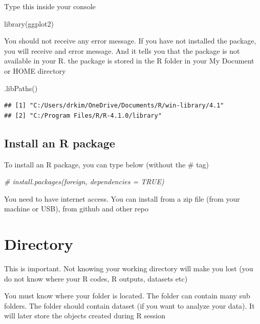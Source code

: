 \documentclass[
]{book}
\makeatletter
\newenvironment{Shaded}{\begin{snugshade}}{\end{snugshade}}
\newcommand{\CommentTok}[1]{\textcolor[rgb]{0.37,0.37,0.37}{\textit{#1}}}
\newcommand{\FunctionTok}[1]{\textcolor[rgb]{0,0,0}{#1}}
\newcommand{\NormalTok}[1]{#1}
\newenvironment{kframe}{%
\medskip{}
\setlength{\fboxsep}{.8em}
 \def\at@end@of@kframe{}%
 \ifinner\ifhmode%
  \def\at@end@of@kframe{\end{minipage}}%
  \begin{minipage}{\columnwidth}%
 \fi\fi%
 \def\FrameCommand##1{\hskip\@totalleftmargin \hskip-\fboxsep
 \colorbox{shadecolor}{##1}\hskip-\fboxsep
     \hskip-\linewidth \hskip-\@totalleftmargin \hskip\columnwidth}%
 \MakeFramed {\advance\hsize-\width
   \@totalleftmargin\z@ \linewidth\hsize
   \@setminipage}}%
 {\par\unskip\endMakeFramed%
 \at@end@of@kframe}
\renewenvironment{Shaded}{\begin{kframe}}{\end{kframe}}
\makeatother
\begin{document}
Type this inside your console

\begin{Shaded}
\begin{Highlighting}[]
\FunctionTok{library}\NormalTok{(ggplot2)}
\end{Highlighting}
\end{Shaded}

You should not receive any error message. If you have not installed the package, you will receive and error message. And it tells you that the package is not available in your R. the package is stored in the R folder in your My Document or HOME directory

\begin{Shaded}
\begin{Highlighting}[]
\FunctionTok{.libPaths}\NormalTok{()}
\end{Highlighting}
\end{Shaded}

\begin{verbatim}
## [1] "C:/Users/drkim/OneDrive/Documents/R/win-library/4.1"
## [2] "C:/Program Files/R/R-4.1.0/library"
\end{verbatim}

\hypertarget{install-an-r-package}{%
\subsection{Install an R package}\label{install-an-r-package}}

To install an R package, you can type below (without the \# tag)

\begin{Shaded}
\begin{Highlighting}[]
\CommentTok{\# install.packages(foreign, dependencies = TRUE)}
\end{Highlighting}
\end{Shaded}

You need to have internet access. You can install from a zip file (from your machine or USB), from github and other repo

\hypertarget{directory}{%
\section{Directory}\label{directory}}

This is important. Not knowing your working directory will make you lost (you do not know where your R codes, R outputs, datasets etc)

You must know where your folder is located. The folder can contain many sub folders. The folder should contain dataset (if you want to analyze your data). It will later store the objects created during R session
\end{document}
